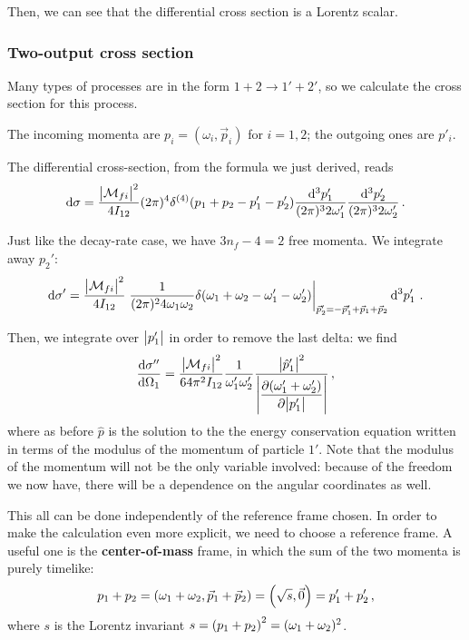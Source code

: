 \documentclass[main.tex]{subfiles}
\begin{document}
Then, we can see that the differential cross section is a Lorentz scalar. 

\subsubsection{Two-output cross section}

Many types of processes are in the form \(1 + 2 \to 1' + 2'\), so we calculate the cross section for this process. 

The incoming momenta are \(p_i = (\omega_{i}, \vec{p}_{i}) \) for \(i=1, 2\); the outgoing ones are \(p'_i\). 

The differential cross-section, from the formula we just derived, reads 
%
\begin{align}
\dd{\sigma } =
\frac{\abs{\mathcal{M}_{fi}}^2}{4 I_{12} }
(2 \pi )^{4}
\delta^{(4)} (p_1+p_2 - p_1' - p_2')
\frac{ \dd[3]{p_1'}}{(2 \pi)^3 2 \omega_{1}'}
\frac{ \dd[3]{p_2'}}{(2 \pi)^3 2 \omega_{2}'}
\,.
\end{align}

Just like the decay-rate case, we have \(3n_f - 4 = 2\) free momenta.
We integrate away \(p_2 '\):
%
\begin{align}
\dd{\sigma }' = \frac{\abs{\mathcal{M}_{fi}}^2}{4 I_{12} }
\eval{\frac{1}{(2 \pi )^2 4 \omega_1 \omega_2 }
\delta (\omega_1 + \omega_2 - \omega_1 ' - \omega_2 ')
}_{\vec{p}_2' = -\vec{p}_1' + \vec{p}_1 + \vec{p}_2} 
\dd[3]{p_1'}
\,.
\end{align}

Then, we integrate over \(\abs{p_1'}\) in order to remove the last delta: we find 
%
\begin{align} \label{eq:covariant-two-particle-cross-section}
\dv{\sigma ''}{\Omega_1 } =\frac{\abs{\mathcal{M}_{fi}}^2}{64 \pi^2 I_{12} } \frac{1}{\omega_1' \omega_2 '} 
\frac{\abs{\hat{p}_1'}^2}{ \displaystyle\abs{\pdv{(\omega_1 ' + \omega_2 ')}{\abs{p_1'}}}}
\,,
\end{align}
%
where as before \(\hat{p}\) is the solution to the the energy conservation equation written in terms of the modulus of the momentum of particle \(1'\). Note that the modulus of the momentum will not be the only variable involved: because of the freedom we now have, there will be a dependence on the angular coordinates as well. 

This all can be done independently of the reference frame chosen. 
In order to make the calculation even more explicit, we need to choose a reference frame. A useful one is the \textbf{center-of-mass} frame, in which the sum of the two momenta is purely timelike: 
%
\begin{align}
p_1 + p_2 = \qty(\omega_1 + \omega_2, \vec{p}_{1} + \vec{p}_{2}) = \qty(\sqrt{s}, \vec{0}) = p'_1 + p'_2
\,,
\end{align}
%
where \(s\) is the Lorentz invariant \(s = \qty(p_1 + p_2 )^2 = (\omega_1 + \omega_2 )^2\). 
\end{document}
